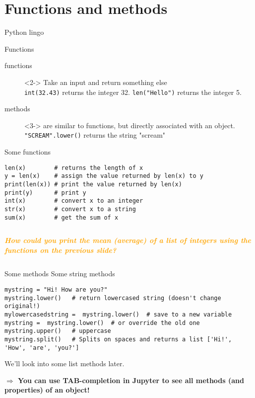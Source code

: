 \documentclass{beamer}
\newcommand{\question}[1]{
	\begin{frame}[plain]
		\begin{columns}
			\column{.3\textwidth}
			\makebox[\columnwidth]{
				\texttt{[image: mannetje.png]}}
			\column{.7\textwidth}
			\large
			\textcolor{orange}{\textbf{\emph{#1}}}
		\end{columns}
\end{frame}}
\begin{document}
	
	
	\section{Functions and methods}
	\begin{frame}{Python lingo}
		\begin{block}{Functions}
			\begin{description}
				\item[{\color{red}functions}]<2-> Take an input and return something else \\ {\tt{int(32.43})} returns the integer 32. \texttt{len("Hello")} returns the integer 5.\\ 
				\item[{\color{red}methods}]<3-> are similar to functions, but directly associated with an object. {\tt{"SCREAM".lower()}} returns the string "scream"
			\end{description}
		\end{block}
	\end{frame}
	
	
	
	\begin{frame}[fragile]{Some functions}
\begin{lstlisting}
len(x)        # returns the length of x
y = len(x)    # assign the value returned by len(x) to y
print(len(x)) # print the value returned by len(x)
print(y)      # print y
int(x)        # convert x to an integer
str(x)        # convert x to a string
sum(x)        # get the sum of x
\end{lstlisting}
	\end{frame}
	
	\question{How could you print the mean (average) of a list of integers using the functions on the previous slide?}
	


\begin{frame}[fragile]{Some methods}
Some string methods
\begin{lstlisting}
mystring = "Hi! How are you?"
mystring.lower()   # return lowercased string (doesn't change original!)
mylowercasedstring =  mystring.lower()  # save to a new variable
mystring =  mystring.lower()  # or override the old one
mystring.upper()   # uppercase
mystring.split()   # Splits on spaces and returns a list ['Hi!', 'How', 'are', 'you?']
\end{lstlisting}

	We'll look into some list methods later.
	
	\textbf{$\Rightarrow$ You can use TAB-completion in Jupyter to see all methods (and properties) of an object!}
\end{frame}
\end{document}
